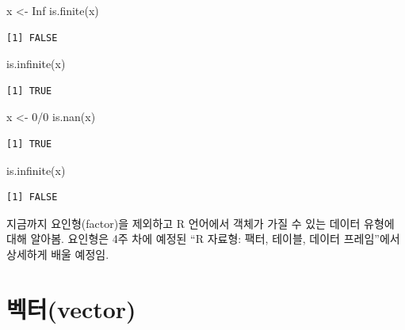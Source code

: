 \documentclass[
  11pt,
]{krantz}
\makeatletter
\newenvironment{Shaded}{\begin{snugshade}}{\end{snugshade}}
\newcommand{\ConstantTok}[1]{\textcolor[rgb]{0,0,0}{#1}}
\newcommand{\DecValTok}[1]{\textcolor[rgb]{0.06,0.06,0.06}{#1}}
\newcommand{\FunctionTok}[1]{\textcolor[rgb]{0,0,0}{#1}}
\newcommand{\NormalTok}[1]{#1}
\newcommand{\OtherTok}[1]{\textcolor[rgb]{0.37,0.37,0.37}{#1}}
\newcommand{\SpecialCharTok}[1]{\textcolor[rgb]{0,0,0}{#1}}
\newenvironment{kframe}{%
\medskip{}
\setlength{\fboxsep}{.8em}
 \def\at@end@of@kframe{}%
 \ifinner\ifhmode%
  \def\at@end@of@kframe{\end{minipage}}%
  \begin{minipage}{\columnwidth}%
 \fi\fi%
 \def\FrameCommand##1{\hskip\@totalleftmargin \hskip-\fboxsep
 \colorbox{shadecolor}{##1}\hskip-\fboxsep
     \hskip-\linewidth \hskip-\@totalleftmargin \hskip\columnwidth}%
 \MakeFramed {\advance\hsize-\width
   \@totalleftmargin\z@ \linewidth\hsize
   \@setminipage}}%
 {\par\unskip\endMakeFramed%
 \at@end@of@kframe}
\newenvironment{rmdblock}[1]
  {
  \begin{itemize}
  \renewcommand{\labelitemi}{
    \raisebox{-.7\height}[0pt][0pt]{
      {\setkeys{Gin}{width=3em,keepaspectratio}\texttt{[image: images/\#1]}}
    }
  }
  \setlength{\fboxsep}{1em}
  \begin{kframe}
  \item
  }
  {
  \end{kframe}
  \end{itemize}
  }
\newenvironment{rmdnote}
  {\begin{rmdblock}{note}}
  {\end{rmdblock}}
\makeatother
\begin{document}
\footnotesize

\begin{Shaded}
\begin{Highlighting}[]
\NormalTok{x }\OtherTok{\textless{}{-}} \ConstantTok{Inf}
\FunctionTok{is.finite}\NormalTok{(x)}
\end{Highlighting}
\end{Shaded}

\begin{verbatim}
[1] FALSE
\end{verbatim}

\begin{Shaded}
\begin{Highlighting}[]
\FunctionTok{is.infinite}\NormalTok{(x)}
\end{Highlighting}
\end{Shaded}

\begin{verbatim}
[1] TRUE
\end{verbatim}

\begin{Shaded}
\begin{Highlighting}[]
\NormalTok{x }\OtherTok{\textless{}{-}} \DecValTok{0}\SpecialCharTok{/}\DecValTok{0}
\FunctionTok{is.nan}\NormalTok{(x)}
\end{Highlighting}
\end{Shaded}

\begin{verbatim}
[1] TRUE
\end{verbatim}

\begin{Shaded}
\begin{Highlighting}[]
\FunctionTok{is.infinite}\NormalTok{(x)}
\end{Highlighting}
\end{Shaded}

\begin{verbatim}
[1] FALSE
\end{verbatim}

\normalsize

\footnotesize

\begin{rmdnote}
지금까지 요인형(factor)을 제외하고 R 언어에서 객체가 가질 수 있는 데이터 유형에 대해 알아봄. 요인형은 4주 차에 예정된 ``R 자료형: 팩터, 테이블, 데이터 프레임''에서 상세하게 배울 예정임.
\end{rmdnote}

\normalsize

\hypertarget{vector}{%
\section{벡터(vector)}\label{vector}}
\end{document}
